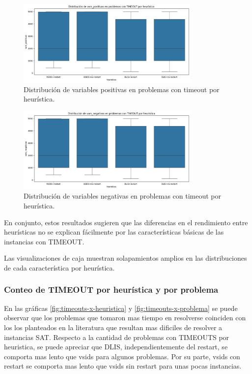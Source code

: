 \begin{figure}[ht]
    \centering
    \includegraphics[width=0.8\textwidth]{Graphics/vars_pos_timeout_x_heuristica.png}
    \caption{Distribuci\'on de variables positivas en problemas con timeout por heur\'istica.}
    \label{fig:vars-pos-timeout-x-heuristica}
\end{figure}

\begin{figure}[ht]
    \centering
    \includegraphics[width=0.8\textwidth]{Graphics/vars_neg_timeout_x_heuristica.png}
    \caption{Distribuci\'on de variables negativas en problemas con timeout por heur\'istica.}
    \label{fig:vars-neg-timeout-x-heuristica}
\end{figure}

En conjunto, estos resultados sugieren que las diferencias en el rendimiento entre heurísticas no se explican fácilmente por las características básicas de las instancias con TIMEOUT.

Las visualizaciones de caja muestran solapamientos amplios en las distribuciones de cada caracter\'istica por heur\'istica.

\subsubsection{Conteo de TIMEOUT por heur\'istica y por problema}

En las gr\'aficas \ref{fig:timeouts-x-heuristica} y \ref{fig:timeouts-x-problema} se puede observar que los problemas que tomaron mas tiempo en resolverse coinciden con los los planteados en la literatura que resultan mas dificiles de resolver a instancias SAT. Respecto a la cantidad de problemas con TIMEOUTS por heuristica, se puede apreciar que DLIS, independientemente del restart, se comporta mas lento que vsids para algunos problemas. Por su parte, vsids con restart se comporta mas lento que vsids sin restart para unas pocas instancias.

